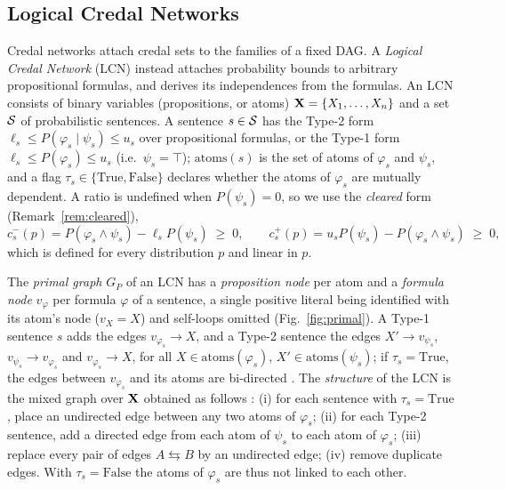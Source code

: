 \documentclass{article} %
\DeclareRobustCommand{\rev}[1]{{\color{blue}#1}}
\newcommand{\atoms}{\mathrm{atoms}}
\begin{document}
\subsection{Logical Credal Networks}
\label{sec-lcn}
Credal networks attach credal sets to the families of a fixed DAG. A \emph{Logical Credal Network} (LCN) \citep{marinescu2022neurips} instead attaches probability bounds to arbitrary propositional formulas, and derives its independences from the formulas. An LCN consists of binary variables (propositions, or atoms) $\mathbf{X} = \{X_1, \dots, X_n \}$ and a set $\mathcal{S}$ of probabilistic sentences. A sentence $s \in \mathcal{S}$ has the Type-2 form $\ell_s \leq P(\varphi_s\mid \psi_s) \leq u_s$ over propositional formulas, or the Type-1 form $\ell_s \leq P(\varphi_s) \leq u_s$ (i.e.\ $\psi_s=\top$); $\atoms(s)$ is the set of atoms of $\varphi_s$ and $\psi_s$, and \rev{a flag $\tau_s\in\{\mathrm{True},\mathrm{False}\}$ declares whether the atoms of $\varphi_s$ are mutually dependent. A ratio is undefined when $P(\psi_s)=0$, so we use the \emph{cleared} form (Remark~\ref{rem:cleared}),}
\begin{equation}\label{eq:cleared}
    c_s^-(p)=P(\varphi_s\wedge\psi_s)-\ell_s P(\psi_s)\;\ge\;0,\qquad c_s^+(p)=u_s P(\psi_s)-P(\varphi_s\wedge\psi_s)\;\ge\;0,
\end{equation}
\rev{which is defined for every distribution $p$ and linear in $p$.}

The \emph{primal graph} $G_P$ of an LCN has a \emph{proposition node} per atom and a \emph{formula node} \rev{$v_\varphi$} per formula $\varphi$ of a sentence, a single positive literal being identified with its atom's node \rev{($v_X=X$)} and self-loops omitted (Fig.~\ref{fig:primal}). A Type-1 sentence $s$ adds the edges \rev{$v_{\varphi_s}\to X$}, and a Type-2 sentence the edges \rev{$X'\to v_{\psi_s}$, $v_{\psi_s}\to v_{\varphi_s}$ and $v_{\varphi_s}\to X$}, for all $X\in\atoms(\varphi_s)$, $X'\in\atoms(\psi_s)$; if $\tau_s=\mathrm{True}$, the edges between \rev{$v_{\varphi_s}$} and its atoms are bi-directed \citep{marinescu2022neurips}. The \emph{structure} of the LCN is the mixed graph over $\mathbf{X}$ obtained as follows \citep{cozman23a}: (i) for each sentence with $\tau_s=\mathrm{True}$, place an undirected edge between any two atoms of $\varphi_s$; (ii) for each Type-2 sentence, add a directed edge from each atom of $\psi_s$ to each atom of $\varphi_s$; (iii) replace every pair of edges $A \leftrightarrows B$ by an undirected edge; (iv) remove duplicate edges. With $\tau_s=\mathrm{False}$ the atoms of $\varphi_s$ are thus not linked to each other.
\end{document}
